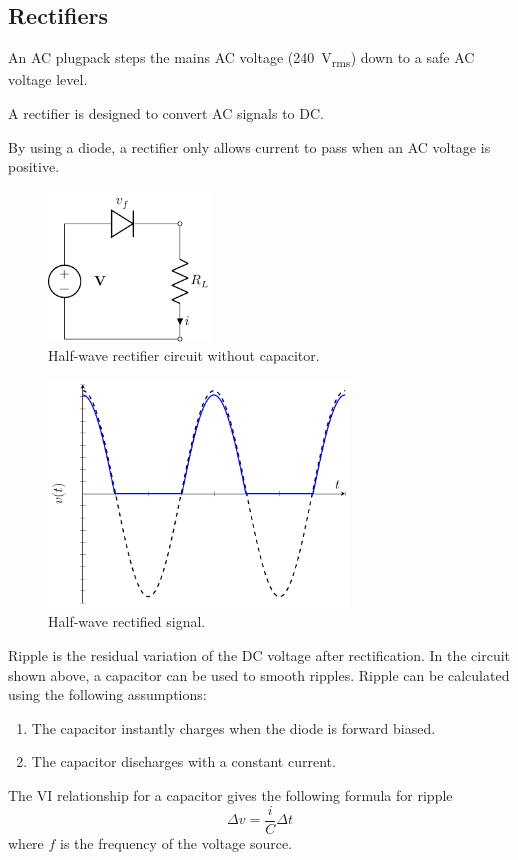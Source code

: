 \documentclass{article}
\begin{document}
\subsection{Rectifiers}
\begin{definition}[Plugpack]
    An AC plugpack steps the mains AC voltage (\qty{240}{V_{rms}}) down to a safe AC voltage level.
\end{definition}
\begin{definition}[Rectifier]
    A rectifier is designed to convert AC signals to DC\@.
\end{definition}
By using a diode, a rectifier only allows current to pass when an AC
voltage is positive.
\begin{figure}[H]
    \centering
    \includegraphics[height = 4cm, keepaspectratio = true]{figures/half_wave_rectifier_without_capacitor.pdf}
    \caption{Half-wave rectifier circuit without capacitor.}
\end{figure}
\begin{figure}[H]
    \centering
    \includegraphics[width = 8cm, keepaspectratio = true]{figures/half_wave_rectifier_without_capacitor_plot.pdf}
    \caption{Half-wave rectified signal.}
\end{figure}
\begin{definition}[Ripple]
    Ripple is the residual variation of the DC voltage after rectification.
    In the circuit shown above, a capacitor can be used to smooth ripples.
    Ripple can be calculated using the following assumptions:
    \begin{enumerate}
        \item The capacitor instantly charges when the diode is forward
              biased.
        \item The capacitor discharges with a constant current.
    \end{enumerate}
    The VI relationship for a capacitor gives the following formula for ripple
    \begin{equation*}
        \Delta v = \frac{i}{C} \Delta t
    \end{equation*}
    where \(f\) is the frequency of the voltage source.
\end{definition}
\end{document}
